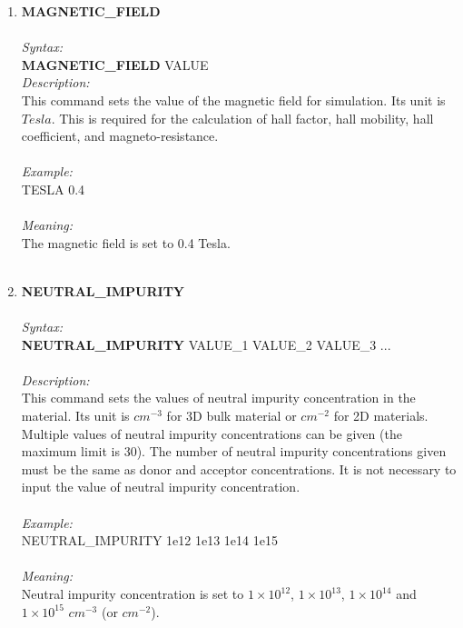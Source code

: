 \documentclass[12pt]{article}
\begin{document}
\begin{enumerate}
    \item \textbf{MAGNETIC\_FIELD}   \\ \\
    \textit{Syntax:} \\
    \textbf{MAGNETIC\_FIELD} VALUE \\
    \textit{Description:} \\
    This command sets the value of the magnetic field for simulation. Its unit is $Tesla$. This is required for the calculation of hall factor, hall mobility, hall coefficient, and magneto-resistance.\\ \\
    \textit{Example:} \\
    TESLA 0.4 \\ \\
    \textit{Meaning:} \\    
    The magnetic field is set to 0.4 Tesla. \\  \\

    \item \textbf{NEUTRAL\_IMPURITY}   \\ \\
    \textit{Syntax:} \\
    \textbf{NEUTRAL\_IMPURITY} VALUE\_1 VALUE\_2 VALUE\_3 ... \\ \\
    \textit{Description:} \\
    This command sets the values of neutral impurity concentration in the material. Its unit is $cm^{-3}$ for 3D bulk material or $cm^{-2}$ for 2D materials. Multiple values of neutral impurity concentrations can be given (the maximum limit is 30). The number of neutral impurity concentrations given must be the same as donor and acceptor concentrations. It is not necessary to input the value of neutral impurity concentration. \\ \\
    \textit{Example:} \\
    NEUTRAL\_IMPURITY 1e12 1e13 1e14 1e15 \\ \\
    \textit{Meaning:} \\   
    Neutral impurity concentration is set to $1 \times 10^{12}$, $1 \times 10^{13}$, $1 \times 10^{14}$ and $1 \times 10^{15}$ $cm^{-3}$ (or $cm^{-2}$). \\ \\



\end{enumerate}
\end{document}
